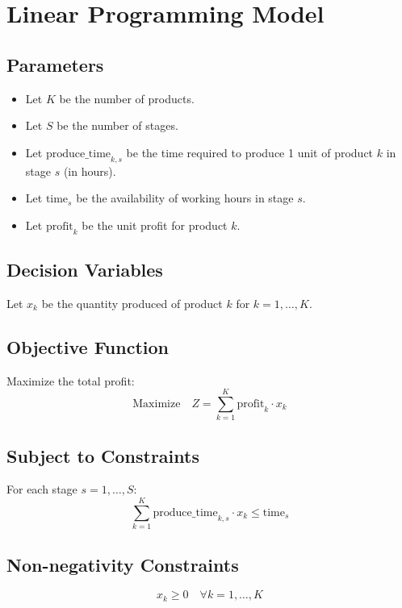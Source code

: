 \documentclass{article}
\begin{document}
\section*{Linear Programming Model}

\subsection*{Parameters}
\begin{itemize}
    \item Let \( K \) be the number of products.
    \item Let \( S \) be the number of stages.
    \item Let \( \text{produce\_time}_{k,s} \) be the time required to produce 1 unit of product \( k \) in stage \( s \) (in hours).
    \item Let \( \text{time}_s \) be the availability of working hours in stage \( s \).
    \item Let \( \text{profit}_k \) be the unit profit for product \( k \).
\end{itemize}

\subsection*{Decision Variables}
Let \( x_k \) be the quantity produced of product \( k \) for \( k = 1, \ldots, K \).

\subsection*{Objective Function}
Maximize the total profit:
\[
\text{Maximize} \quad Z = \sum_{k=1}^{K} \text{profit}_k \cdot x_k
\]

\subsection*{Subject to Constraints}
For each stage \( s = 1, \ldots, S \):
\[
\sum_{k=1}^{K} \text{produce\_time}_{k,s} \cdot x_k \leq \text{time}_s
\]

\subsection*{Non-negativity Constraints}
\[
x_k \geq 0 \quad \forall k = 1, \ldots, K
\]
\end{document}
